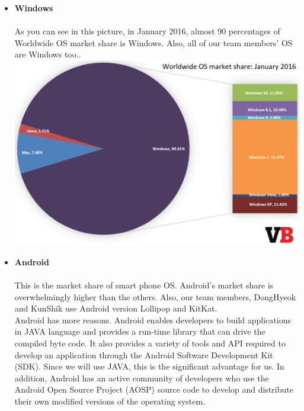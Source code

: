 \documentclass[12pt]{article}
\begin{document}
\begin{itemize}
%
\item\textbf{Windows}\\ 
\\As you can see in this picture, in January 2016, almost 90 percentages of Worldwide OS market share is Windows. Also, all of our team members' OS are Windows too..\\[2\baselineskip]
%
\includegraphics[width=140mm,scale=2]{windowsgraph}
%

\item\textbf{Android}\\
\\This is the market share of smart phone OS. Android's market share is overwhelmingly higher than the others. Also, our team members, DongHyeok and KunShik use Android version Lollipop and KitKat.\\
Android has more reasons. Android enables developers to build applications in JAVA language and provides a run-time library that can drive the compiled byte code. It also provides a variety of tools and API required to develop an application through the Android Software Development Kit (SDK). Since we will use JAVA, this is the significant advantage for us. In addition, Android has an active community of developers who use the Android Open Source Project (AOSP) source code to develop and distribute their own modified versions of the operating system.
 \\ 


\end{itemize}
\end{document}
